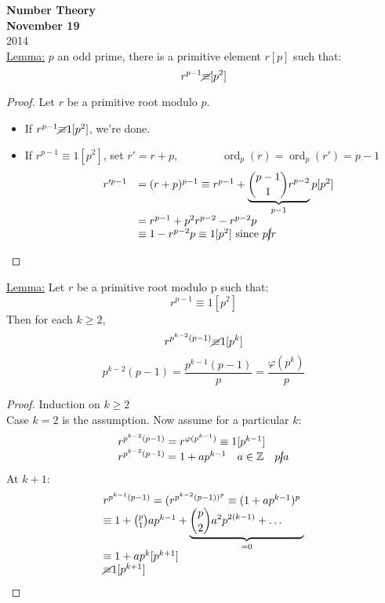 \documentclass{report}
\newcommand{\nequiv}{\cancel{\equiv}}
\DeclareMathOperator{\ord}{ord}
\begin{document}
{\centering
\Large
\textbf{Number Theory}\\
\normalsize
\textbf{November 19}\\
2014\\
}
\vspace{10mm}
\underline{Lemma:} $p$ an odd prime, there is a primitive element $r [p]$ such that:\\
									\[r^{p-1} \nequiv[p^2]\]
\begin{proof} Let $r$ be a primitive root modulo $p$.\\
							\begin{itemize}
							\item If $r^{p-1} \nequiv 1 [p^2]$, we're done.
							\item If $r^{p-1} \equiv 1 [p^2]$, set $r'=r+p$,$\qquad \qquad \ord_p(r)=\ord_p(r')=p-1$
										\[\begin{array}{lcl}
										&r'^{p-1}&=(r+p)^{p-1}\equiv r^{p-1}+\underbrace{\binom{p-1}{1} r^{p-2}}_{p-1} p[p^2]\\
										&&=r^{p-1}+p^2r^{p-2}-r^{p-2}p\\
										&&\equiv 1-r^{p-2}p\equiv 1[p^2] \text{  since  } p\cancel{\mid} r
											\end{array}\]
							\end{itemize}
\end{proof}
\underline{Lemma:} Let $r$ be a primitive root modulo p such that: \[r^{p-1}\equiv 1[p^2]\]
										Then for each $k\geq 2$, 	\[r^{p^{k-2}(p-1)}\nequiv 1 [p^k]\]
																							\[p^{k-2}(p-1)=\frac{p^{k-1}(p-1)}{p}=\frac{\varphi(p^k)}{p}\]
\begin{proof} Induction on $k\geq 2$\\
							Case $k=2$ is the assumption.
							Now assume for a particular $k$:\[\begin{array}{lcl}
																						r^{p^{k-2}(p-1)}=r^{\varphi(p^{k-1})}\equiv 1[p^{k-1}]\\
																						r^{p^{k-2}(p-1)}=1+ap^{k-1} \quad a\in \mathbb{Z}\quad  p\cancel{\mid}a\\
																						\end{array}\]
							At $k+1$: \[\begin{array}{lcl}
													r^{p^{k-1}(p-1)}=(r^{p^{k-2}(p-1))^p}\equiv(1+ap^{k-1})^p\\
													\equiv 1+\binom{p}{1} ap^{k-1}+\underbrace{\binom{p}{2} a^2p^{2(k-1)}+\dots \qquad}_{=0}\\
													\equiv 1+ap^k[p^{k+1}]\\
													\nequiv 1[p^{k+1}]
													\end{array}\]
\end{proof}																	
\end{document}
